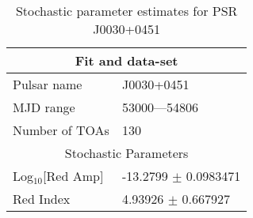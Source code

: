 \documentclass{article}
\begin{document}
\begin{table*}
\caption{Stochastic parameter estimates for PSR J0030+0451}
\begin{tabular}{ll}
\hline\hline
\multicolumn{2}{c}{Fit and data-set} \\ 
\hline
Pulsar name\dotfill & J0030+0451 \\ 
MJD range\dotfill & 53000---54806 \\ 
Number of TOAs\dotfill & 130 \\
\hline
\multicolumn{2}{c}{Stochastic Parameters} \\ 
\hline
Log$_{10}$[Red Amp] \dotfill & -13.2799 $\pm$ 0.0983471  \\ 
Red Index \dotfill & 4.93926 $\pm$ 0.667927  \\ 
\hline
\end{tabular}
\label{Table:J0030+0451}
\end{table*} 
\end{document}
